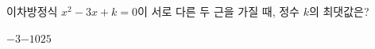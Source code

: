 이차방정식 $x^2-3x+k=0$이 서로 다른 두 근을 가질 때, 정수 $k$의 최댓값은?
\begin{choices32}{$-3$}{$-1$}{$0$}{$2$}{$5$}\end{choices32}

